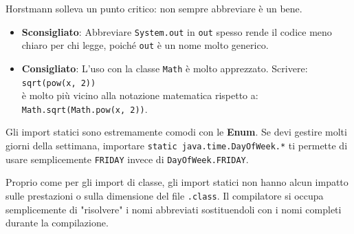 Horstmann solleva un punto critico: non sempre abbreviare è un bene.
\begin{itemize}
    \item \textbf{Sconsigliato}: Abbreviare \texttt{System.out} in \texttt{out} spesso rende il codice meno chiaro per chi legge, poiché \texttt{out} è un nome molto generico.
    \item \textbf{Consigliato}: L'uso con la classe \texttt{Math} è molto apprezzato. Scrivere:\\[2pt] \quad\texttt{sqrt(pow(x, 2))} \\[2pt] \quad è molto più vicino alla notazione matematica rispetto a: \\[2pt] \quad\texttt{Math.sqrt(Math.pow(x, 2))}.
\end{itemize}

\begin{tip}
Gli import statici sono estremamente comodi con le \textbf{Enum}. Se devi gestire molti giorni della settimana, importare \texttt{static java.time.DayOfWeek.*} ti permette di usare semplicemente \texttt{FRIDAY} invece di \texttt{DayOfWeek.FRIDAY}.
\end{tip}


\begin{observation}
Proprio come per gli import di classe, gli import statici non hanno alcun impatto sulle prestazioni o sulla dimensione del file \texttt{.class}. Il compilatore si occupa semplicemente di "risolvere" i nomi abbreviati sostituendoli con i nomi completi durante la compilazione.
\end{observation}